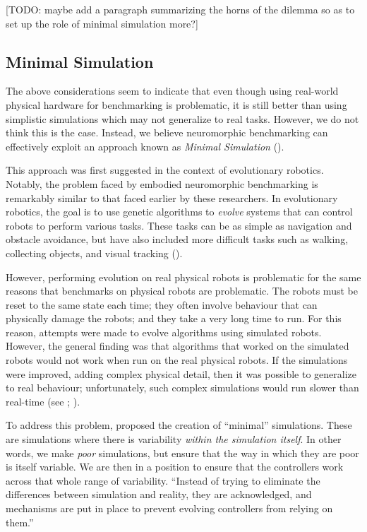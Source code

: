 \documentclass{frontiersSCNS} %
\begin{document}
[TODO: maybe add a paragraph summarizing the horns of the dilemma so as to set up the
role of minimal simulation more?]

\subsection{Minimal Simulation}

The above considerations seem to indicate that even though using real-world
physical hardware for benchmarking is problematic, it is still better than
using simplistic simulations which may not generalize to real tasks.  However,
we do not think this is the case.  Instead, we believe neuromorphic benchmarking can effectively exploit an approach 
known as \emph{Minimal Simulation}
(\citealt{Jakobi97evolutionaryrobotics}).

This approach was first suggested in the context of evolutionary robotics.  
Notably, the problem faced by embodied neuromorphic benchmarking is remarkably 
similar to that faced earlier by these researchers. 
In evolutionary robotics, the
goal is to use genetic algorithms to \emph{evolve} systems that can control
robots to perform various tasks.  These tasks can be as simple as navigation
and obstacle avoidance, but have also included more difficult tasks such as walking,
collecting objects, and visual tracking (\citealt{Nolfi2000}).

However, performing evolution on real physical robots is problematic
for the same reasons that benchmarks on physical robots are problematic.  The
robots must be reset to the same state each time; they often involve
behaviour that can physically damage the robots; and they take a very long
time to run.  For this reason, attempts were made to evolve algorithms using simulated
robots.  However, the general finding was that algorithms that worked on the
simulated robots would not work when run on the real physical robots.  If
the simulations were improved, adding complex physical detail, then it was
possible to generalize to real behaviour; unfortunately, such complex
simulations would run slower than real-time (see \citealt{Husbands1992}; 
\citealt{Husbands1993}).

To address this problem, \cite{Jakobi97evolutionaryrobotics} proposed the creation of
``minimal'' simulations.  These are simulations where there is variability
\emph{within the simulation itself}.  In other words, we make \emph{poor}
simulations, but ensure that the way in which they are poor is itself
variable.  We are then in a position to ensure that the controllers work across that whole
range of variability.  ``Instead of trying to eliminate the differences between
simulation and reality, they are acknowledged, and mechanisms are put in place
to prevent evolving controllers from relying on them.'' \citep[p.~48]{jakobiThesis}
\end{document}
